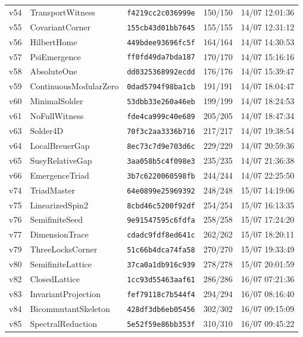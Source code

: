 \documentclass[11pt]{article}
\theoremstyle{definition}\newtheorem{deriv}{Derivation}
\begin{document}
{\begin{longtable}{@{}lllll@{}}
v54 & TransportWitness & \texttt{f4219cc2c036999e} & 150/150 & 14/07 12:01:36 \\
v55 & CovariantCorner & \texttt{155cb43d01bb7645} & 155/155 & 14/07 12:31:12 \\
v56 & HilbertHome & \texttt{449bdee93696fc5f} & 164/164 & 14/07 14:30:53 \\
v57 & PsiEmergence & \texttt{ff0fd49da7bda187} & 170/170 & 14/07 15:16:16 \\
v58 & AbsoluteOne & \texttt{dd0325368992ecdd} & 176/176 & 14/07 15:39:47 \\
v59 & ContinuousModularZero & \texttt{0dad5794f98ba1cb} & 191/191 & 14/07 18:04:47 \\
v60 & MinimalSolder & \texttt{53dbb33e260a46eb} & 199/199 & 14/07 18:24:53 \\
v61 & NoFullWitness & \texttt{fde4ca999c40e689} & 205/205 & 14/07 18:47:34 \\
v63 & Solder4D & \texttt{70f3c2aa3336b716} & 217/217 & 14/07 19:38:54 \\
v64 & LocalBreuerGap & \texttt{8ec73c7d9e703d6c} & 229/229 & 14/07 20:59:36 \\
v65 & SusyRelativeGap & \texttt{3aa058b5c4f098e3} & 235/235 & 14/07 21:36:38 \\
v66 & EmergenceTriad & \texttt{3b7c6220060598fb} & 244/244 & 14/07 22:25:50 \\
v74 & TriadMaster & \texttt{64e0899e25969392} & 248/248 & 15/07 14:19:06 \\
v75 & LinearizedSpin2 & \texttt{8cbd46c5200f92df} & 254/254 & 15/07 16:13:35 \\
v76 & SemifiniteSeed & \texttt{9e91547595c6fdfa} & 258/258 & 15/07 17:24:20 \\
v77 & DimensionTrace & \texttt{cdadc9fdf8ed641c} & 262/262 & 15/07 18:20:11 \\
v79 & ThreeLocksCorner & \texttt{51c66b4dca74fa58} & 270/270 & 15/07 19:33:49 \\
v80 & SemifiniteLattice & \texttt{37ca0a1db916c939} & 278/278 & 15/07 20:01:59 \\
v82 & ClosedLattice & \texttt{1cc93d55463aaf61} & 286/286 & 16/07 07:21:36 \\
v83 & InvariantProjection & \texttt{fef79118c7b544f4} & 294/294 & 16/07 08:16:40 \\
v84 & BicommutantSkeleton & \texttt{428df3db6eb05456} & 302/302 & 16/07 09:15:09 \\
v85 & SpectralReduction & \texttt{5e52f59e86bb353f} & 310/310 & 16/07 09:45:22 \\

\end{longtable}}
\end{document}
